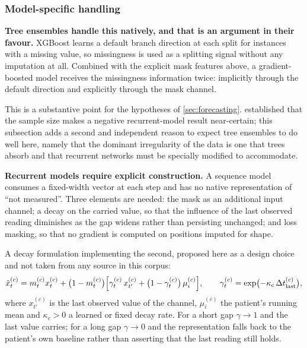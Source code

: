 \documentclass[12pt,a4paper,oneside]{report}
\begin{document}
\subsubsection{Model-specific handling}\label{sec:mask-models}

\textbf{Tree ensembles handle this natively, and that is an argument in their favour.} XGBoost learns a default branch direction at each split for instances with a missing value, so missingness is used as a splitting signal without any imputation at all. Combined with the explicit mask features above, a gradient-boosted model receives the missingness information twice: implicitly through the default direction and explicitly through the mask channel.

This is a substantive point for the hypotheses of \cref{sec:forecasting}.  established that the sample size makes a negative recurrent-model result near-certain; this subsection adds a second and independent reason to expect tree ensembles to do well here, namely that the dominant irregularity of the data is one that trees absorb and that recurrent networks must be specially modified to accommodate.

\textbf{Recurrent models require explicit construction.} A sequence model consumes a fixed-width vector at each step and has no native representation of ``not measured''. Three elements are needed: the mask as an additional input channel; a decay on the carried value, so that the influence of the last observed reading diminishes as the gap widens rather than persisting unchanged; and loss masking, so that no gradient is computed on positions imputed for shape.

A decay formulation implementing the second, proposed here as a design choice and not taken from any source in this corpus:
\begin{equation}
  \tilde{x}^{(c)}_t = m^{(c)}_t x^{(c)}_t
  + \bigl(1 - m^{(c)}_t\bigr)\Bigl[\gamma^{(c)}_t\, x^{(c)}_{t'}
  + \bigl(1-\gamma^{(c)}_t\bigr)\,\mu^{(c)}_i\Bigr],
  \qquad
  \gamma^{(c)}_t = \exp\bigl(-\kappa_c\,\Delta t^{(c)}_{\text{last}}\bigr),
\end{equation}
where $x^{(c)}_{t'}$ is the last observed value of the channel, $\mu^{(c)}_i$ the patient's running mean and $\kappa_c > 0$ a learned or fixed decay rate. For a short gap $\gamma \to 1$ and the last value carries; for a long gap $\gamma \to 0$ and the representation falls back to the patient's own baseline rather than asserting that the last reading still holds.
\end{document}

